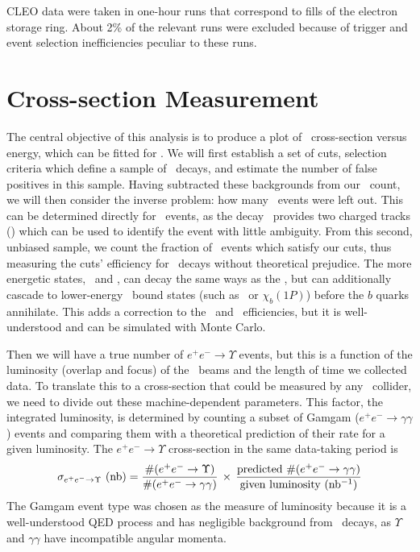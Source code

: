 \documentclass[aps,prd,preprint,superscriptaddress,tightenlines,nofootinbib,floatfix]{revtex4}
\begin{document}
CLEO data were taken in one-hour runs that correspond to fills of the
electron storage ring.  About 2\% of the relevant runs were excluded
because of trigger and event selection inefficiencies peculiar to
these runs.

%
\section{Cross-section Measurement}
%

The central objective of this analysis is to produce a plot of \ups\
cross-section versus energy, which can be fitted for \gee.  We will
first establish a set of cuts, selection criteria which define a
sample of \ups\ decays, and estimate the number of false positives in
this sample.  Having subtracted these backgrounds from our \ups\
count, we will then consider the inverse problem: how many \ups\
events were left out.  This can be determined directly for \uone\
events, as the decay \twotoone\ provides two charged tracks (\pip)
which can be used to identify the event with little ambiguity.  From
this second, unbiased sample, we count the fraction of \uone\ events
which satisfy our cuts, thus measuring the cuts' efficiency for \uone\
decays without theoretical prejudice.  The more energetic states,
\utwo\ and \uthree, can decay the same ways as the \uone, but can
additionally cascade to lower-energy \bbar\ bound states (such as
\uone\ or $\chi_b(1P)$) before the $b$ quarks annihilate.  This adds a
correction to the \utwo\ and \uthree\ efficiencies, but it is
well-understood and can be simulated with Monte Carlo.

Then we will have a true number of $e^+e^- \to \Upsilon$ events, but
this is a function of the luminosity (overlap and focus) of the \ee\
beams and the length of time we collected data.  To translate this to
a cross-section that could be measured by any \ee\ collider, we need
to divide out these machine-dependent parameters.  This factor, the
integrated luminosity, is determined by counting a subset of Gamgam
($e^+e^- \to \gamma\gamma$) events and comparing them with a
theoretical prediction of their rate for a given luminosity.  The
$e^+e^- \to \Upsilon$ cross-section in the same data-taking period is
\begin{equation}
  \sigma_{e^+e^- \to \Upsilon} \mbox{ (nb)} = \frac{\#(e^+e^- \to
  \Upsilon)}{\#(e^+e^- \to \gamma\gamma)} \, \times \, \frac{\mbox{predicted }
  \#(e^+e^- \to \gamma\gamma)}{\mbox{given luminosity (nb$^{-1}$)}}
\end{equation}
The Gamgam event type was chosen as the measure of luminosity because
it is a well-understood QED process and has negligible background from
\ups\ decays, as $\Upsilon$ and $\gamma\gamma$ have incompatible
angular momenta.
\end{document}
